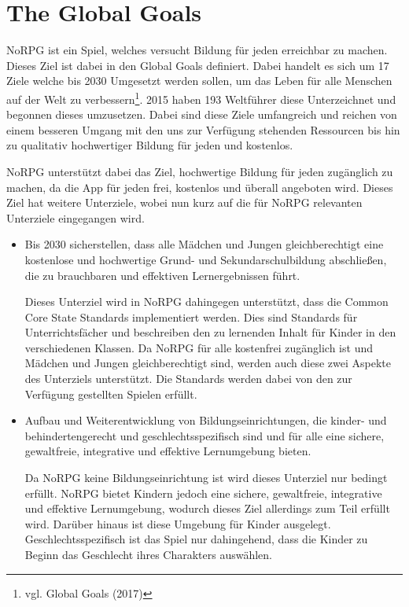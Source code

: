 \section{The Global Goals}
NoRPG ist ein Spiel, welches versucht Bildung für jeden erreichbar zu machen. Dieses Ziel ist dabei in den Global Goals definiert. Dabei handelt es sich um 17 Ziele welche bis 2030 Umgesetzt werden sollen, um das Leben für alle Menschen auf der Welt zu verbessern\footnote{vgl. Global Goals \cite{global} (2017)}. 2015 haben 193 Weltführer diese Unterzeichnet und begonnen dieses umzusetzen. Dabei sind diese Ziele umfangreich und reichen von einem besseren Umgang mit den uns zur Verfügung stehenden Ressourcen bis hin zu qualitativ hochwertiger Bildung für jeden und kostenlos.

NoRPG unterstützt dabei das Ziel, hochwertige Bildung für jeden zugänglich zu machen, da die App für jeden frei, kostenlos und überall angeboten wird. Dieses Ziel hat weitere Unterziele, wobei nun kurz auf die für NoRPG relevanten Unterziele eingegangen wird.

\begin{itemize}
\item Bis 2030 sicherstellen, dass alle Mädchen und Jungen gleichberechtigt eine kostenlose und hochwertige Grund- und Sekundarschulbildung abschließen, die zu brauchbaren und effektiven Lernergebnissen führt.

Dieses Unterziel wird in NoRPG dahingegen unterstützt, dass die Common Core State Standards implementiert werden. Dies sind Standards für Unterrichtsfächer und beschreiben den zu lernenden Inhalt für Kinder in den verschiedenen Klassen. Da NoRPG für alle kostenfrei zugänglich ist und Mädchen und Jungen gleichberechtigt sind, werden auch diese zwei Aspekte des Unterziels unterstützt. Die Standards werden dabei von den zur Verfügung gestellten Spielen erfüllt.

\item Aufbau und Weiterentwicklung von Bildungseinrichtungen, die kinder- und behindertengerecht und geschlechtsspezifisch sind und für alle eine sichere, gewaltfreie, integrative und effektive Lernumgebung bieten.

Da NoRPG keine Bildungseinrichtung ist wird dieses Unterziel nur bedingt erfüllt. NoRPG bietet Kindern jedoch eine sichere, gewaltfreie, integrative und effektive Lernumgebung, wodurch dieses Ziel allerdings zum Teil erfüllt wird. Darüber hinaus ist diese Umgebung für Kinder ausgelegt. Geschlechtsspezifisch ist das Spiel nur dahingehend, dass die Kinder zu Beginn das Geschlecht ihres Charakters auswählen.
\end{itemize}

